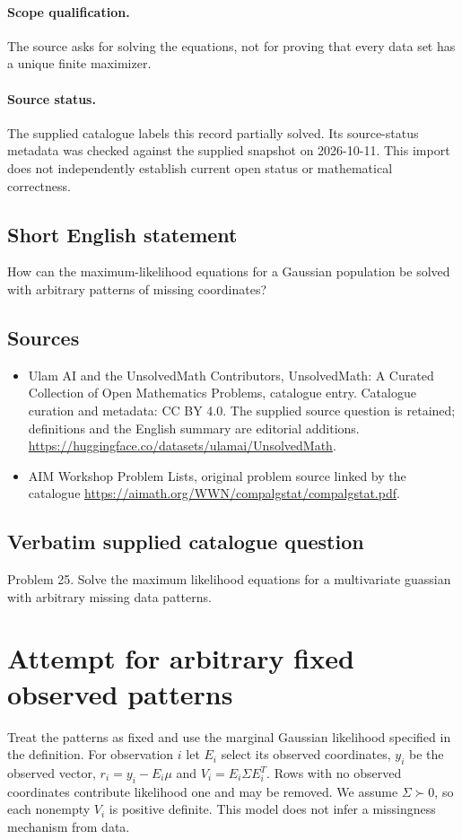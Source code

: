 \documentclass[11pt]{article}
\begin{document}
\paragraph{Scope qualification.}
The source asks for solving the equations, not for proving that every data set has a unique finite maximizer.
\paragraph{Source status.}
The supplied catalogue labels this record partially solved. Its source-status metadata was checked against the supplied snapshot on 2026-10-11. This import does not independently establish current open status or mathematical correctness.
\subsection{Short English statement}
How can the maximum-likelihood equations for a Gaussian population be solved with arbitrary patterns of missing coordinates?
\subsection{Sources}
\begin{itemize}
\item[S1] Ulam AI and the UnsolvedMath Contributors, UnsolvedMath: A Curated Collection of Open Mathematics Problems, catalogue entry. Catalogue curation and metadata: CC BY 4.0. The supplied source question is retained; definitions and the English summary are editorial additions.
\url{https://huggingface.co/datasets/ulamai/UnsolvedMath}.
\item[S2] AIM Workshop Problem Lists, original problem source linked by the catalogue
\url{https://aimath.org/WWN/compalgstat/compalgstat.pdf}.
\end{itemize}
\subsection{Verbatim supplied catalogue question}
Problem 25. Solve the maximum likelihood equations for a multivariate guassian with arbitrary missing data patterns.

\section{Attempt for arbitrary fixed observed patterns}
Treat the patterns as fixed and use the marginal Gaussian likelihood
specified in the definition. For observation $i$ let $E_i$ select its
observed coordinates, $y_i$ be the observed vector,
$r_i=y_i-E_i\mu$ and $V_i=E_i\Sigma E_i^T$.
Rows with no observed coordinates contribute likelihood one and may be
removed. We assume $\Sigma\succ0$, so each nonempty $V_i$ is positive
definite. This model does not infer a missingness mechanism from data.
\end{document}
